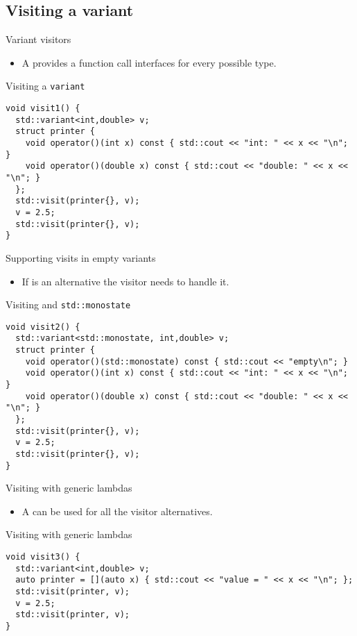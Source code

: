 \subsection{Visiting a variant}

\begin{frame}[t,fragile]{Variant visitors}
\begin{itemize}
  \item A  provides a function call interfaces for every
        possible type.
\end{itemize}
\begin{block}{Visiting a \texttt{variant}}
\begin{lstlisting}
void visit1() {
  std::variant<int,double> v;
  struct printer {
    void operator()(int x) const { std::cout << "int: " << x << "\n"; }
    void operator()(double x) const { std::cout << "double: " << x << "\n"; }
  };
  std::visit(printer{}, v);
  v = 2.5;
  std::visit(printer{}, v);
}
\end{lstlisting}
\end{block}
\end{frame}

\begin{frame}[t,fragile]{Supporting visits in empty variants}
\begin{itemize}
  \item If  is an alternative the visitor
        needs to handle it.
\end{itemize}
\begin{block}{Visiting and \texttt{std::monostate}}
\begin{lstlisting}
void visit2() {
  std::variant<std::monostate, int,double> v;
  struct printer {
    void operator()(std::monostate) const { std::cout << "empty\n"; }
    void operator()(int x) const { std::cout << "int: " << x << "\n"; }
    void operator()(double x) const { std::cout << "double: " << x << "\n"; }
  };
  std::visit(printer{}, v);
  v = 2.5;
  std::visit(printer{}, v);
}
\end{lstlisting}
\end{block}
\end{frame}

\begin{frame}[t,fragile]{Visiting with generic lambdas}
\begin{itemize}
  \item A  can be used for all the visitor alternatives.
\end{itemize}
\begin{block}{Visiting with generic lambdas}
\begin{lstlisting}
void visit3() {
  std::variant<int,double> v;
  auto printer = [](auto x) { std::cout << "value = " << x << "\n"; };
  std::visit(printer, v);
  v = 2.5;
  std::visit(printer, v);
}
\end{lstlisting}
\end{block}
\end{frame}

